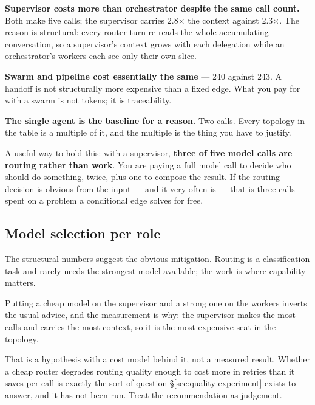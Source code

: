\textbf{Supervisor costs more than orchestrator despite the same call count.}
Both make five calls; the supervisor carries 2.8$\times$ the context against
2.3$\times$. The reason is structural: every router turn re-reads the whole
accumulating conversation, so a supervisor's context grows with each delegation
while an orchestrator's workers each see only their own slice.


\textbf{Swarm and pipeline cost essentially the same} --- 240 against 243. A
handoff is not structurally more expensive than a fixed edge. What you pay for
with a swarm is not tokens; it is traceability.

\textbf{The single agent is the baseline for a reason.} Two calls. Every topology
in the table is a multiple of it, and the multiple is the thing you have to
justify.

\begin{note}
A useful way to hold this: with a supervisor, \textbf{three of five model calls
are routing rather than work}. You are paying a full model call to decide who
should do something, twice, plus one to compose the result. If the routing
decision is obvious from the input --- and it very often is --- that is three
calls spent on a problem a conditional edge solves for free.
\end{note}

\subsection{Model selection per role}
\label{sec:model-per-role}

The structural numbers suggest the obvious mitigation. Routing is a
classification task and rarely needs the strongest model available; the work is
where capability matters.

Putting a cheap model on the supervisor and a strong one on the workers inverts
the usual advice, and the measurement is why: the supervisor makes the most calls
and carries the most context, so it is the most expensive seat in the topology.

\begin{warning}
That is a hypothesis with a cost model behind it, not a measured result. Whether
a cheap router degrades routing quality enough to cost more in retries than it
saves per call is exactly the sort of question \S\ref{sec:quality-experiment}
exists to answer, and it has not been run. Treat the recommendation as judgement.
\end{warning}


